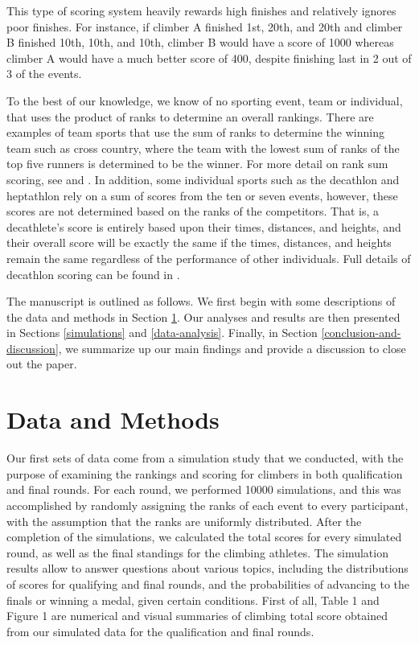 \documentclass[12pt]{article}
\begin{document}
This type of scoring system heavily rewards high finishes and relatively
ignores poor finishes. For instance, if climber A finished 1st, 20th,
and 20th and climber B finished 10th, 10th, and 10th, climber B would
have a score of 1000 whereas climber A would have a much better score of
400, despite finishing last in 2 out of 3 of the events.

To the best of our knowledge, we know of no sporting event, team or
individual, that uses the product of ranks to determine an overall
rankings. There are examples of team sports that use the sum of ranks to
determine the winning team such as cross country, where the team with
the lowest sum of ranks of the top five runners is determined to be the
winner. For more detail on rank sum scoring, see \citet{hammond2007} and
\citet{boudreau2018}. In addition, some individual sports such as the
decathlon and heptathlon rely on a sum of scores from the ten or seven
events, however, these scores are not determined based on the ranks of
the competitors. That is, a decathlete's score is entirely based upon
their times, distances, and heights, and their overall score will be
exactly the same if the times, distances, and heights remain the same
regardless of the performance of other individuals. Full details of
decathlon scoring can be found in \citet{westera2006}.

The manuscript is outlined as follows. We first begin with some
descriptions of the data and methods in Section \ref{data-and-methods}.
Our analyses and results are then presented in Sections
\ref{simulations} and \ref{data-analysis}. Finally, in Section
\ref{conclusion-and-discussion}, we summarize up our main findings and
provide a discussion to close out the paper.

\hypertarget{data-and-methods}{%
\section{Data and Methods}\label{data-and-methods}}

Our first sets of data come from a simulation study that we conducted,
with the purpose of examining the rankings and scoring for climbers in
both qualification and final rounds. For each round, we performed 10000
simulations, and this was accomplished by randomly assigning the ranks
of each event to every participant, with the assumption that the ranks
are uniformly distributed. After the completion of the simulations, we
calculated the total scores for every simulated round, as well as the
final standings for the climbing athletes. The simulation results allow
to answer questions about various topics, including the distributions of
scores for qualifying and final rounds, and the probabilities of
advancing to the finals or winning a medal, given certain conditions.
First of all, Table 1 and Figure 1 are numerical and visual summaries of
climbing total score obtained from our simulated data for the
qualification and final rounds.
\end{document}
